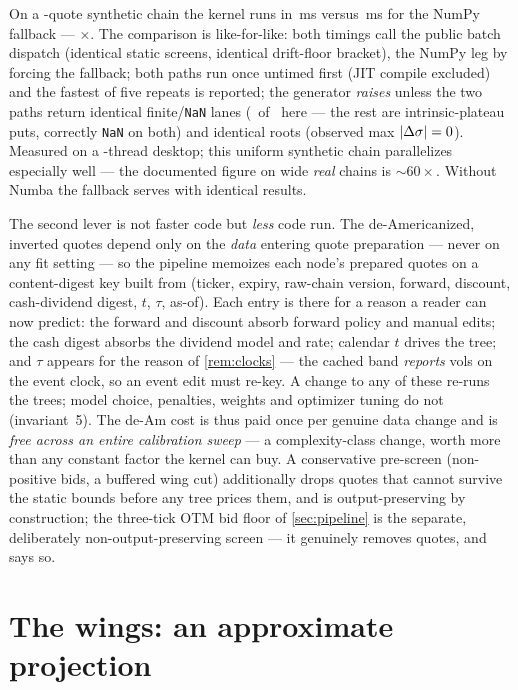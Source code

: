 \documentclass[11pt]{article}
\begin{document}
\begin{perfbox}
On a \deamchainn-quote synthetic chain the kernel runs in \deamnumbams\,ms
versus \deamnumpyms\,ms for the NumPy fallback --- \deamspeedup$\times$.
The comparison is like-for-like: both timings call the public batch
dispatch (identical static screens, identical drift-floor bracket), the
NumPy leg by forcing the fallback; both paths run once untimed first (JIT
compile excluded) and the fastest of five repeats is reported; the
generator \emph{raises} unless the two paths return identical
finite/\texttt{NaN} lanes (\deamchainfinite\ of \deamchainn\ here --- the
rest are intrinsic-plateau puts, correctly \texttt{NaN} on both) and
identical roots (observed max $\lvert\Delta\sigma\rvert=0$).  Measured on a
\deamthreads-thread desktop; this uniform synthetic chain parallelizes
especially well --- the documented figure on wide \emph{real} chains is
$\sim60\times$.  Without Numba the fallback serves with identical
results.
\end{perfbox}

The second lever is not faster code but \emph{less} code run.  The
de-Americanized, inverted quotes depend only on the \emph{data} entering
quote preparation --- never on any fit setting --- so the pipeline
memoizes each node's prepared quotes on a content-digest key built from
(ticker, expiry, raw-chain version, forward, discount, cash-dividend
digest, $t$, $\tau$, as-of).  Each entry is there for a reason a reader
can now predict: the forward and discount absorb forward policy and
manual edits; the cash digest absorbs the dividend model and rate;
calendar $t$ drives the tree; and $\tau$ appears for the reason of
\cref{rem:clocks} --- the cached band \emph{reports} vols on the event
clock, so an event edit must re-key.  A change to any of these re-runs
the trees; model choice, penalties, weights and optimizer tuning do not
(invariant~5).  The de-Am cost is thus paid once per genuine data change
and is \emph{free across an entire calibration sweep} --- a
complexity-class change, worth more than any constant factor the kernel
can buy.  A conservative pre-screen (non-positive bids, a buffered wing
cut) additionally drops quotes that cannot survive the static bounds
before any tree prices them, and is output-preserving by construction; the
three-tick OTM bid floor of \cref{sec:pipeline} is the separate,
deliberately non-output-preserving screen --- it genuinely removes quotes,
and says so.

\section{The wings: an approximate projection}
\label{sec:convex}
\end{document}
